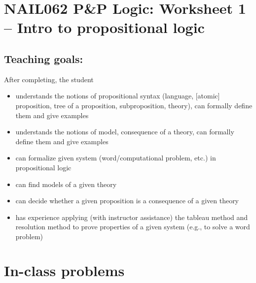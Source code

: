 \section*{NAIL062 P\&P Logic: Worksheet 1 -- Intro to propositional logic}

\subsection*{Teaching goals:} After completing, the student

    \begin{itemize}\setlength{\itemsep}{0pt}
        \item understands the notions of propositional syntax (language, [atomic] proposition, tree of a proposition, subproposition, theory), can formally define them and give examples
        \item understands the notions of model, consequence of a theory, can formally define them and give examples
        \item can formalize given system (word/computational problem, etc.) in propositional logic
        \item can find models of a given theory
        \item can decide whether a given proposition is a consequence of a given theory
        \item has experience applying (with instructor assistance) the tableau method and resolution method to prove properties of a given system (e.g., to solve a word problem)
    \end{itemize}


\section*{In-class problems}


